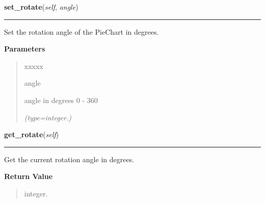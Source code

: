     \label{pygtk_chart:pie_chart:PieChart:set_rotate}

    \vspace{0.5ex}

\hspace{.8\funcindent}\begin{boxedminipage}{\funcwidth}

    \raggedright \textbf{set\_rotate}(\textit{self}, \textit{angle})

    \vspace{-1.5ex}

    \rule{\textwidth}{0.5\fboxrule}
\setlength{\parskip}{2ex}
    Set the rotation angle of the PieChart in degrees.

\setlength{\parskip}{1ex}
      \textbf{Parameters}
      \vspace{-1ex}

      \begin{quote}
        \begin{Ventry}{xxxxx}

          \item[angle]

          angle in degrees 0 - 360

            {\it (type=integer.)}

        \end{Ventry}

      \end{quote}

    \end{boxedminipage}

    \label{pygtk_chart:pie_chart:PieChart:get_rotate}

    \vspace{0.5ex}

\hspace{.8\funcindent}\begin{boxedminipage}{\funcwidth}

    \raggedright \textbf{get\_rotate}(\textit{self})

    \vspace{-1.5ex}

    \rule{\textwidth}{0.5\fboxrule}
\setlength{\parskip}{2ex}
    Get the current rotation angle in degrees.

\setlength{\parskip}{1ex}
      \textbf{Return Value}
    \vspace{-1ex}

      \begin{quote}
      integer.

      \end{quote}

    \end{boxedminipage}

